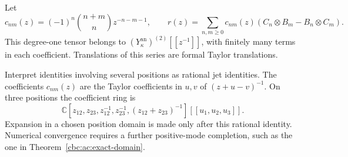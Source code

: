 Let
\[
 c_{nm}(z)=(-1)^n\binom{n+m}{n}z^{-n-m-1},
 \qquad
 r(z)=\sum_{n,m\geq0}c_{nm}(z)
       (C_n\otimes B_m-B_n\otimes C_m).
\]
This degree-one tensor belongs to
\((Y^{\mathrm{an}}_\kappa)^{(2)}[[z^{-1}]]\), with finitely many
terms in each coefficient. Translations of this series are formal
Taylor translations.

Interpret identities involving several positions as rational jet
identities. The coefficients \(c_{nm}(z)\) are the Taylor coefficients
in \(u,v\) of \((z+u-v)^{-1}\). On three positions the coefficient ring is
\[
 \mathbb C[z_{12},z_{23},
     z_{12}^{-1},z_{23}^{-1},(z_{12}+z_{23})^{-1}]
       [[u_1,u_2,u_3]].
\]
Expansion in a chosen position domain is made only after this rational
identity. Numerical convergence requires a further positive-mode completion,
such as the one in Theorem~\ref{cbc:ac:exact-domain}.

